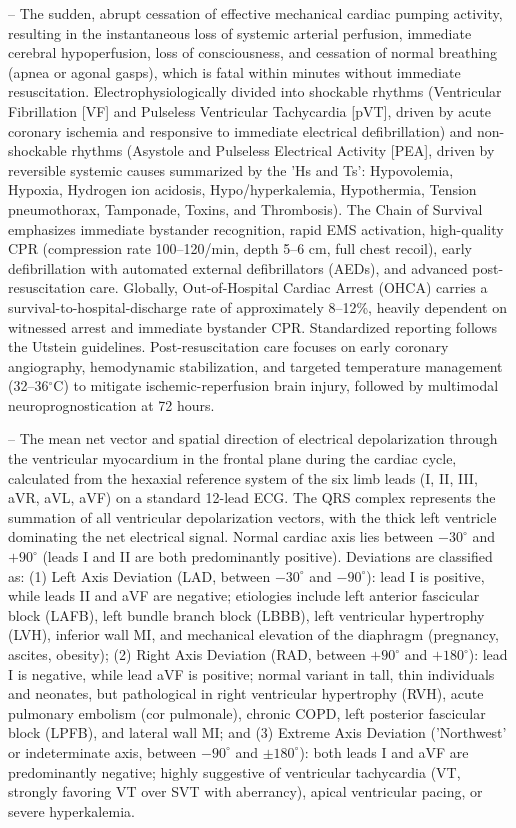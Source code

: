 -- The sudden, abrupt cessation of effective mechanical cardiac pumping activity, resulting in the instantaneous loss of systemic arterial perfusion, immediate cerebral hypoperfusion, loss of consciousness, and cessation of normal breathing (apnea or agonal gasps), which is fatal within minutes without immediate resuscitation. Electrophysiologically divided into shockable rhythms (Ventricular Fibrillation [VF] and Pulseless Ventricular Tachycardia [pVT], driven by acute coronary ischemia and responsive to immediate electrical defibrillation) and non-shockable rhythms (Asystole and Pulseless Electrical Activity [PEA], driven by reversible systemic causes summarized by the 'Hs and Ts': Hypovolemia, Hypoxia, Hydrogen ion acidosis, Hypo/hyperkalemia, Hypothermia, Tension pneumothorax, Tamponade, Toxins, and Thrombosis). The Chain of Survival emphasizes immediate bystander recognition, rapid EMS activation, high-quality CPR (compression rate 100--120/min, depth 5--6 cm, full chest recoil), early defibrillation with automated external defibrillators (AEDs), and advanced post-resuscitation care. Globally, Out-of-Hospital Cardiac Arrest (OHCA) carries a survival-to-hospital-discharge rate of approximately 8--12\%, heavily dependent on witnessed arrest and immediate bystander CPR. Standardized reporting follows the Utstein guidelines. Post-resuscitation care focuses on early coronary angiography, hemodynamic stabilization, and targeted temperature management (32--36$^\circ$C) to mitigate ischemic-reperfusion brain injury, followed by multimodal neuroprognostication at 72 hours.

-- The mean net vector and spatial direction of electrical depolarization through the ventricular myocardium in the frontal plane during the cardiac cycle, calculated from the hexaxial reference system of the six limb leads (I, II, III, aVR, aVL, aVF) on a standard 12-lead ECG. The QRS complex represents the summation of all ventricular depolarization vectors, with the thick left ventricle dominating the net electrical signal. Normal cardiac axis lies between $-30^\circ$ and $+90^\circ$ (leads I and II are both predominantly positive). Deviations are classified as: (1) Left Axis Deviation (LAD, between $-30^\circ$ and $-90^\circ$): lead I is positive, while leads II and aVF are negative; etiologies include left anterior fascicular block (LAFB), left bundle branch block (LBBB), left ventricular hypertrophy (LVH), inferior wall MI, and mechanical elevation of the diaphragm (pregnancy, ascites, obesity); (2) Right Axis Deviation (RAD, between $+90^\circ$ and $+180^\circ$): lead I is negative, while lead aVF is positive; normal variant in tall, thin individuals and neonates, but pathological in right ventricular hypertrophy (RVH), acute pulmonary embolism (cor pulmonale), chronic COPD, left posterior fascicular block (LPFB), and lateral wall MI; and (3) Extreme Axis Deviation ('Northwest' or indeterminate axis, between $-90^\circ$ and $\pm 180^\circ$): both leads I and aVF are predominantly negative; highly suggestive of ventricular tachycardia (VT, strongly favoring VT over SVT with aberrancy), apical ventricular pacing, or severe hyperkalemia.

